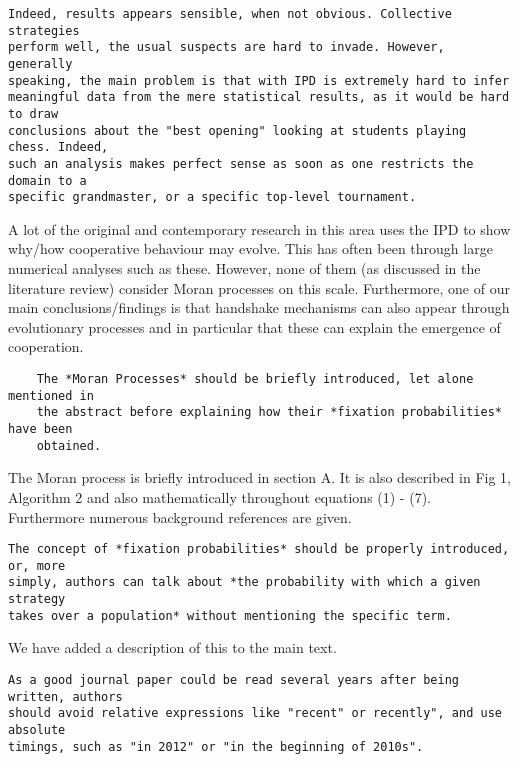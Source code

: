 \documentclass[a4]{article}
\begin{document}
\begin{verbatim}
Indeed, results appears sensible, when not obvious. Collective strategies
perform well, the usual suspects are hard to invade. However, generally
speaking, the main problem is that with IPD is extremely hard to infer
meaningful data from the mere statistical results, as it would be hard to draw
conclusions about the "best opening" looking at students playing chess. Indeed,
such an analysis makes perfect sense as soon as one restricts the domain to a
specific grandmaster, or a specific top-level tournament.
\end{verbatim}

A lot of the original and contemporary research in this area uses the IPD to
show why/how
cooperative behaviour may evolve. This has often been through large numerical
analyses such as these. However, none of them (as discussed in the literature
review) consider Moran processes on this scale. Furthermore, one of our main
conclusions/findings is that handshake mechanisms can also appear through
evolutionary processes and in particular that these can explain the emergence of
cooperation.

\begin{verbatim}
    The *Moran Processes* should be briefly introduced, let alone mentioned in
    the abstract before explaining how their *fixation probabilities* have been
    obtained.
\end{verbatim}

The Moran process is briefly introduced in section A. It is also described in
Fig 1, Algorithm 2 and also mathematically throughout equations (1) - (7).
Furthermore numerous background references are given.

\begin{verbatim}
The concept of *fixation probabilities* should be properly introduced, or, more
simply, authors can talk about *the probability with which a given strategy
takes over a population* without mentioning the specific term.
\end{verbatim}

We have added a description of this to the main text.

\begin{verbatim}
As a good journal paper could be read several years after being written, authors
should avoid relative expressions like "recent" or recently", and use absolute
timings, such as "in 2012" or "in the beginning of 2010s".
\end{verbatim}
\end{document}
